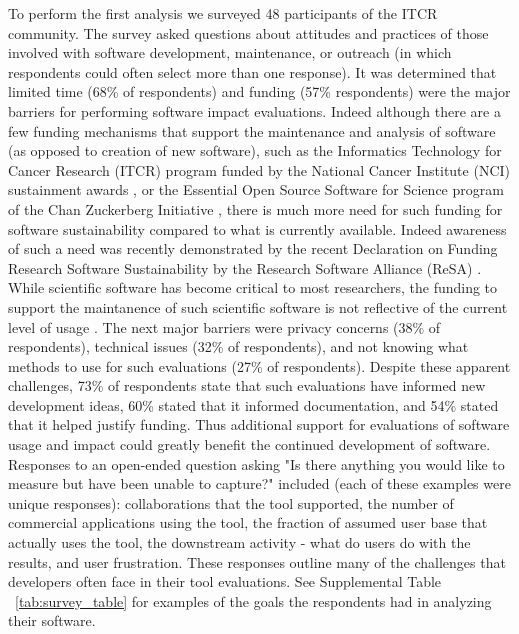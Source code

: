 \documentclass{article}
\begin{document}
To perform the first analysis we surveyed 48 participants of the ITCR community. The survey asked questions about attitudes and practices of those involved with software development, maintenance, or outreach (in which respondents could often select more than one response). It was determined that limited time (68\% of respondents) and funding (57\% respondents) were the major barriers for performing software impact evaluations. Indeed although there are a few funding mechanisms that support the maintenance and analysis of software (as opposed to creation of new software), such as the Informatics Technology for Cancer Research (ITCR) program funded by the National Cancer Institute (NCI) sustainment awards \cite{kibbe_cancer_2017, warner_informatics_2020}, or the Essential Open Source Software for Science program of the Chan Zuckerberg Initiative \cite{CZ_essential_2019}, there is much more need for such funding for software sustainability compared to what is currently available. Indeed awareness of such a need was recently demonstrated by the recent Declaration on Funding Research Software Sustainability by the Research Software Alliance (ReSA) \cite{barker_amsterdam_2023}. While scientific software has become critical to most researchers, the funding to support the maintanence of such scientific software is not reflective of the current level of usage \cite{siepel_challenges_2019}. The next major barriers were privacy concerns (38\% of respondents), technical issues (32\% of respondents), and not knowing what methods to use for such evaluations (27\% of respondents). Despite these apparent challenges,  73\% of respondents state that such evaluations have informed new development ideas, 60\% stated that it informed documentation, and 54\% stated that it helped justify funding.  Thus additional support for evaluations of software usage and impact could greatly benefit the continued development of software. Responses to an open-ended question asking "Is there anything you would like to measure but have been unable to capture?" included (each of these examples were unique responses): collaborations that the tool supported, the number of commercial applications using the tool, the fraction of assumed user base that actually uses the tool, the downstream activity - what do users do with the results, and user frustration. These responses outline many of the challenges that developers often face in their tool evaluations. See Supplemental Table ~\ref{tab:survey_table} for examples of the goals the respondents had in analyzing their software.
\end{document}
